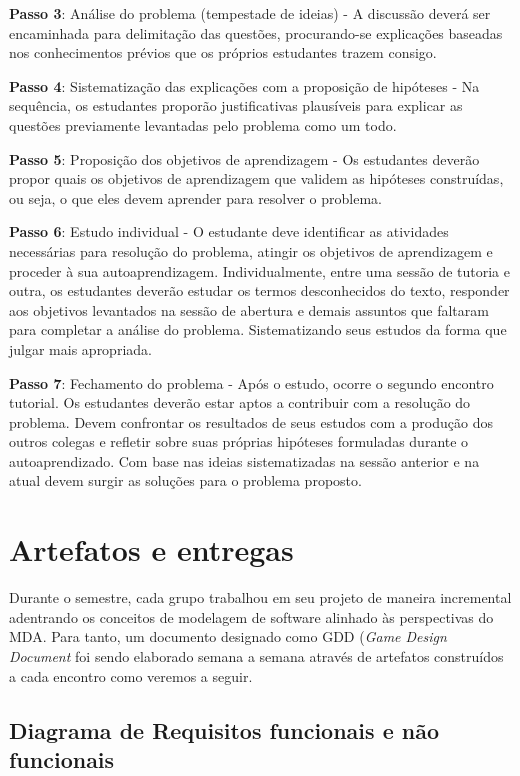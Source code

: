\documentclass[12pt, onecolumn]{IEEEtran}
\begin{document}
\textbf{Passo 3}: Análise do problema (tempestade de ideias) - A discussão deverá ser encaminhada para delimitação das questões, procurando-se explicações baseadas nos conhecimentos prévios que os próprios estudantes trazem consigo. 

\textbf{Passo 4}: Sistematização das explicações com a proposição de hipóteses - Na sequência, os estudantes proporão justificativas plausíveis para explicar as questões previamente levantadas pelo problema como um todo. 

\textbf{Passo 5}: Proposição dos objetivos de aprendizagem - Os estudantes deverão propor quais os objetivos de aprendizagem que validem as hipóteses construídas, ou seja, o que eles devem aprender para resolver o problema. 

\textbf{Passo 6}: Estudo individual - O estudante deve identificar as atividades necessárias para resolução do problema, atingir os objetivos de aprendizagem e proceder à sua autoaprendizagem. Individualmente, entre uma sessão de tutoria e outra, os estudantes deverão estudar os termos desconhecidos do texto, responder aos objetivos levantados na sessão de abertura e demais assuntos que faltaram para completar a análise do problema. Sistematizando seus estudos da forma que julgar mais apropriada.

\textbf{Passo 7}: Fechamento do problema - Após o estudo, ocorre o segundo encontro tutorial. Os estudantes deverão estar aptos a contribuir com a resolução do problema. Devem confrontar os resultados de seus estudos com a produção dos outros colegas e refletir sobre suas próprias hipóteses formuladas durante o autoaprendizado. Com base nas ideias sistematizadas na sessão anterior e na atual devem surgir as soluções para o problema proposto.

\section{Artefatos e entregas}

Durante o semestre, cada grupo trabalhou em seu projeto de maneira incremental adentrando os conceitos de modelagem de software alinhado às perspectivas do MDA. Para tanto, um documento designado como GDD (\textit{Game Design Document} foi sendo elaborado semana a semana através de artefatos construídos a cada encontro como veremos a seguir.


\subsection{Diagrama de Requisitos funcionais e não funcionais}
\end{document}
